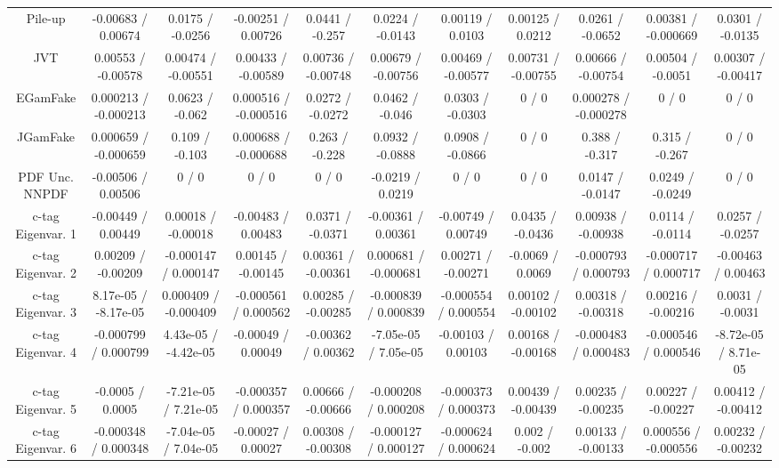 \begin{table}[htbp]
\begin{center}
\begin{tabular}{|c|c|c|c|c|c|c|c|c|c|c|}
  Pile-up & -0.00683 / 0.00674 & 0.0175 / -0.0256 & -0.00251 / 0.00726 & 0.0441 / -0.257 & 0.0224 / -0.0143 & 0.00119 / 0.0103 & 0.00125 / 0.0212 & 0.0261 / -0.0652 & 0.00381 / -0.000669 & 0.0301 / -0.0135 \\ 
  JVT & 0.00553 / -0.00578 & 0.00474 / -0.00551 & 0.00433 / -0.00589 & 0.00736 / -0.00748 & 0.00679 / -0.00756 & 0.00469 / -0.00577 & 0.00731 / -0.00755 & 0.00666 / -0.00754 & 0.00504 / -0.0051 & 0.00307 / -0.00417 \\ 
  EGamFake & 0.000213 / -0.000213 & 0.0623 / -0.062 & 0.000516 / -0.000516 & 0.0272 / -0.0272 & 0.0462 / -0.046 & 0.0303 / -0.0303 & 0 / 0 & 0.000278 / -0.000278 & 0 / 0 & 0 / 0 \\ 
  JGamFake & 0.000659 / -0.000659 & 0.109 / -0.103 & 0.000688 / -0.000688 & 0.263 / -0.228 & 0.0932 / -0.0888 & 0.0908 / -0.0866 & 0 / 0 & 0.388 / -0.317 & 0.315 / -0.267 & 0 / 0 \\ 
  PDF Unc. NNPDF & -0.00506 / 0.00506 & 0 / 0 & 0 / 0 & 0 / 0 & -0.0219 / 0.0219 & 0 / 0 & 0 / 0 & 0.0147 / -0.0147 & 0.0249 / -0.0249 & 0 / 0 \\ 
  c-tag Eigenvar. 1 & -0.00449 / 0.00449 & 0.00018 / -0.00018 & -0.00483 / 0.00483 & 0.0371 / -0.0371 & -0.00361 / 0.00361 & -0.00749 / 0.00749 & 0.0435 / -0.0436 & 0.00938 / -0.00938 & 0.0114 / -0.0114 & 0.0257 / -0.0257 \\ 
  c-tag Eigenvar. 2 & 0.00209 / -0.00209 & -0.000147 / 0.000147 & 0.00145 / -0.00145 & 0.00361 / -0.00361 & 0.000681 / -0.000681 & 0.00271 / -0.00271 & -0.0069 / 0.0069 & -0.000793 / 0.000793 & -0.000717 / 0.000717 & -0.00463 / 0.00463 \\ 
  c-tag Eigenvar. 3 & 8.17e-05 / -8.17e-05 & 0.000409 / -0.000409 & -0.000561 / 0.000562 & 0.00285 / -0.00285 & -0.000839 / 0.000839 & -0.000554 / 0.000554 & 0.00102 / -0.00102 & 0.00318 / -0.00318 & 0.00216 / -0.00216 & 0.0031 / -0.0031 \\ 
  c-tag Eigenvar. 4 & -0.000799 / 0.000799 & 4.43e-05 / -4.42e-05 & -0.00049 / 0.00049 & -0.00362 / 0.00362 & -7.05e-05 / 7.05e-05 & -0.00103 / 0.00103 & 0.00168 / -0.00168 & -0.000483 / 0.000483 & -0.000546 / 0.000546 & -8.72e-05 / 8.71e-05 \\ 
  c-tag Eigenvar. 5 & -0.0005 / 0.0005 & -7.21e-05 / 7.21e-05 & -0.000357 / 0.000357 & 0.00666 / -0.00666 & -0.000208 / 0.000208 & -0.000373 / 0.000373 & 0.00439 / -0.00439 & 0.00235 / -0.00235 & 0.00227 / -0.00227 & 0.00412 / -0.00412 \\ 
  c-tag Eigenvar. 6 & -0.000348 / 0.000348 & -7.04e-05 / 7.04e-05 & -0.00027 / 0.00027 & 0.00308 / -0.00308 & -0.000127 / 0.000127 & -0.000624 / 0.000624 & 0.002 / -0.002 & 0.00133 / -0.00133 & 0.000556 / -0.000556 & 0.00232 / -0.00232 \\ 

\end{tabular}
\end{center}
\end{table}
